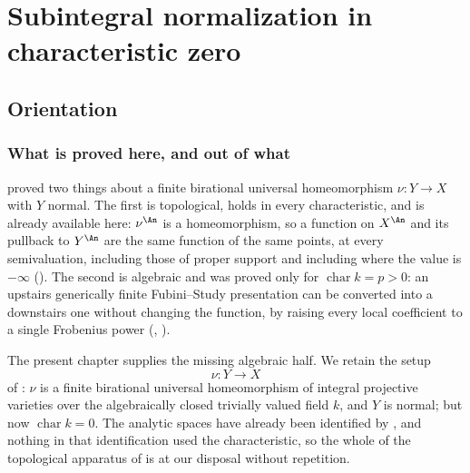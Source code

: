 \chapter{Subintegral normalization in characteristic zero}
\label{chap:bj-subintegral-normalization}

\section{Orientation}
\label{sec:ch44-orientation}

\subsection{What is proved here, and out of what}
\label{sec:ch44-what}

 proved two things about a finite
birational universal homeomorphism $\nu:Y\to X$ with $Y$ normal.  The
first is topological, holds in every characteristic, and is already
available here: $\nu^{\An}$ is a homeomorphism, so a function on
$X^{\An}$ and its pullback to $Y^{\An}$ are the same function of the
same points, at every semivaluation, including those of proper support and
including where the value is $-\infty$
().  The second is algebraic
and was proved only for $\operatorname{char}k=p>0$: an upstairs
generically finite Fubini--Study presentation can be converted into a
downstairs one without changing the function, by raising every local
coefficient to a single Frobenius power
(,
).

The present chapter supplies the missing algebraic half.  We retain the
setup
\[
                         \nu:Y\longrightarrow X
\tag{44.1}\label{eq:bj-char-zero-universal-map}
\]
of : $\nu$ is a finite birational
universal homeomorphism of integral projective varieties over the
algebraically closed trivially valued field $k$, and $Y$ is normal;
but now $\operatorname{char}k=0$.  The analytic spaces have already been
identified by , and nothing in
that identification used the characteristic, so the whole of the topological
apparatus of  is at our disposal without repetition.

